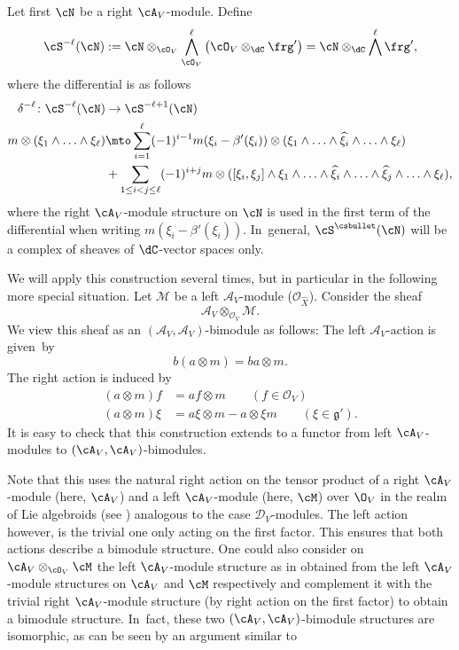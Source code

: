 Let first $\cN$ be a right $\cA_V$\nobreakdash-mod\-ule. Define
\[
\cS^{-\ell}(\cN) :=
\cN \otimes_{\cO_V}
\bigwedge_{\cO_V}^\ell \left(\cO_V\otimes_\dC \frg'\right)
=
\cN \otimes_\dC \bigwedge^\ell \frg',
\]
where the differential is as follows
\begin{align}\label{eq:DiffEKCESComplex}
\delta^{-\ell} \colon \cS^{-\ell}(\cN) &\to \cS^{-\ell+1}(\cN) \\\notag
m \otimes (\xi_1 \wedge \ldots \wedge \xi_\ell) &\mto  \sum_{i=1}^\ell (-1)^{i-1} m (\xi_i-\beta'(\xi_i)) \otimes (\xi_1 \wedge \ldots \wedge \widehat{\xi}_i \wedge\ldots \wedge \xi_\ell)\\\notag
& +\sum\limits_{1 \leq i < j \leq \ell} (-1)^{i+j} m \otimes ([\xi_i,\xi_j] \wedge \xi_1 \wedge \ldots \wedge \widehat{\xi}_i \wedge \ldots \wedge \widehat{\xi}_j \wedge \ldots \wedge \xi_\ell),
\end{align}
where the right $\cA_V$\nobreakdash-mod\-ule structure on $\cN$ is used in the first term of the differential when writing $m (\xi_i-\beta'(\xi_i))$. In~general, $\cS^{\csbullet}(\cN)$ will be a complex of sheaves of $\dC$-vector spaces only.

We will apply this construction several times, but in particular in the following more special situation.
Let $\mathcal{M}$ be a left $\mathscr{A}_V$\nobreakdash-mod\-ule (\eg $\mathcal{O}_{\hat{X}}$). Consider the sheaf
\[
\mathscr{A}_V\otimes_{\mathcal{O}_V}\mathcal{M}.
\]
We view this sheaf as an $(\mathscr{A}_V,\mathscr{A}_V)$-bimodule as follows: The left $\mathscr{A}_V$-action is given~by
\[
b(a\otimes m) = ba\otimes m.
\]
The right action is induced by
\begin{align*}
(a\otimes m)f &= af \otimes m \qquad (f\in \mathcal{O}_V)\\
(a\otimes m)\xi &= a\xi \otimes m - a \otimes \xi m\qquad (\xi \in \mathfrak{g}').
\end{align*}
It is easy to check that this construction extends to a functor from left $\cA_V$\nobreakdash-mod\-ules to $(\cA_V,\cA_V)$-bimodules.

Note that this uses the natural right action on the tensor product of a right $\cA_V$\nobreakdash-mod\-ule (here, $\cA_V$) and a left $\cA_V$\nobreakdash-mod\-ule (here, $\cM$) over $\O_V$ in the realm of Lie algebroids (see \eg \cite[Prop.\,2.2.1]{Che99}) analogous to the case $\mathscr D_V$\nobreakdash-mod\-ules. The left action however, is the trivial one only acting on the first factor. This ensures that both actions describe a bimodule structure. One could also consider on $\cA_V \otimes_{\cO_V} \cM$ the left $\cA_V$\nobreakdash-mod\-ule structure as in \cite[\S (2.1)]{Huebschmann} obtained from the left $\cA_V$\nobreakdash-mod\-ule structures on $\cA_V$ and $\cM$ respectively and complement it with the trivial right $\cA_V$\nobreakdash-mod\-ule structure (by right action on the first factor) to obtain a bimodule structure. In~fact, these two $(\cA_V,\cA_V)$-bimodule structures are isomorphic, as can be seen by an argument similar to \cite[Cor.\,A.12]{Narvaez-Duality-BS}

